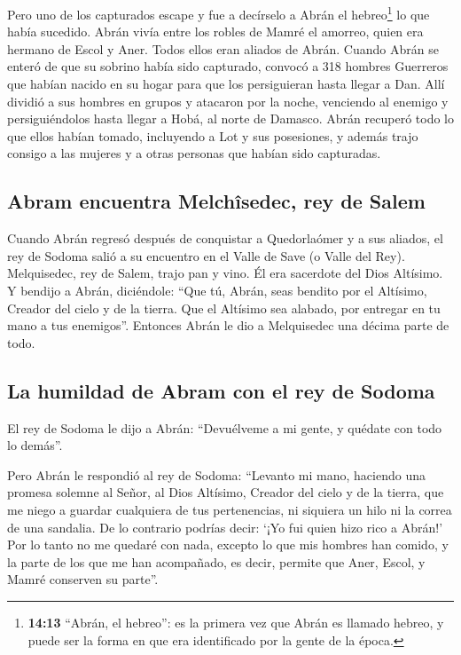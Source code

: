  Pero uno de los capturados escape y fue a decírselo a
Abrán el hebreo\footnote{\textbf{14:13} ``Abrán, el hebreo'': es la
  primera vez que Abrán es llamado hebreo, y puede ser la forma en que
  era identificado por la gente de la época.} lo que había sucedido.
Abrán vivía entre los robles de Mamré el amorreo, quien era hermano de
Escol y Aner. Todos ellos eran aliados de Abrán.  Cuando
Abrán se enteró de que su sobrino había sido capturado, convocó a 318
hombres Guerreros que habían nacido en su hogar para que los
persiguieran hasta llegar a Dan.  Allí dividió a sus
hombres en grupos y atacaron por la noche, venciendo al enemigo y
persiguiéndolos hasta llegar a Hobá, al norte de Damasco.
 Abrán recuperó todo lo que ellos habían tomado,
incluyendo a Lot y sus posesiones, y además trajo consigo a las mujeres
y a otras personas que habían sido capturadas.

\hypertarget{abram-encuentra-melchuxeesedec-rey-de-salem}{%
\subsection{Abram encuentra Melchîsedec, rey de
Salem}\label{abram-encuentra-melchuxeesedec-rey-de-salem}}

 Cuando Abrán regresó después de conquistar a
Quedorlaómer y a sus aliados, el rey de Sodoma salió a su encuentro en
el Valle de Save (o Valle del Rey).  Melquisedec, rey de
Salem, trajo pan y vino. Él era sacerdote del Dios Altísimo.
 Y bendijo a Abrán, diciéndole: ``Que tú, Abrán, seas
bendito por el Altísimo, Creador del cielo y de la tierra.
 Que el Altísimo sea alabado, por entregar en tu mano a
tus enemigos''. Entonces Abrán le dio a Melquisedec una décima parte de
todo.

\hypertarget{la-humildad-de-abram-con-el-rey-de-sodoma}{%
\subsection{La humildad de Abram con el rey de
Sodoma}\label{la-humildad-de-abram-con-el-rey-de-sodoma}}

 El rey de Sodoma le dijo a Abrán: ``Devuélveme a mi
gente, y quédate con todo lo demás''.

 Pero Abrán le respondió al rey de Sodoma: ``Levanto mi
mano, haciendo una promesa solemne al Señor, al Dios Altísimo, Creador
del cielo y de la tierra,  que me niego a guardar
cualquiera de tus pertenencias, ni siquiera un hilo ni la correa de una
sandalia. De lo contrario podrías decir: `¡Yo fui quien hizo rico a
Abrán!'  Por lo tanto no me quedaré con nada, excepto lo
que mis hombres han comido, y la parte de los que me han acompañado, es
decir, permite que Aner, Escol, y Mamré conserven su parte''.

